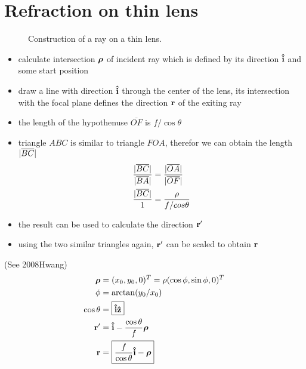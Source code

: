 \section{Refraction on thin lens}
\begin{figure}[!hbt]
  \centering
  
  \caption{Construction of a ray on a thin lens.}
\end{figure}
\begin{itemize}
\item calculate intersection $\boldsymbol\rho$ of incident ray which is defined
  by its direction $\mathbf{\hat{i}}$ and some start position
\item draw a line with direction $\mathbf{\hat{i}}$ through the center of the lens,
  its intersection with the focal plane defines the direction $\mathbf{r}$ of
  the exiting ray
\item the length of the hypothenuse $\overline{OF}$ is $f/\cos\theta$
\item triangle $ABC$ is similar to triangle $FOA$, therefor we can
  obtain the length $\mathopen| \overline{BC} \mathclose|$ 
  \begin{align}
    \frac{\mathopen| \overline{BC} \mathclose|}{\mathopen| \overline{BA} \mathclose|}&=
    \frac{\mathopen| \overline{OA} \mathclose|}{\mathopen| \overline{OF} \mathclose|}\\
    \frac{\mathopen| \overline{BC} \mathclose|}{1}&=
    \frac{\rho}{f/cos\theta}
  \end{align}
\item the result can be used to calculate the direction $\mathbf{r}'$
\item using the two similar triangles again, $\mathbf{r}'$ can be scaled to
  obtain $\mathbf{r}$
\end{itemize}
(See 2008Hwang)
\begin{align}
  \boldsymbol\rho&=(x_0,y_0,0)^T=\rho (\cos\phi,\sin\phi,0)^T\\
  \phi&=\arctan(y_0/x_0)\\
  \cos\theta&=\boxed{\mathbf{\hat{i}}\mathbf{\hat{z}}}\\
  \mathbf{r}'&=\mathbf{\hat{i}}- \frac{\cos\theta}{f}\boldsymbol\rho\\
   \mathbf{r}&=\boxed{\frac{f}{\cos\theta} \mathbf{\hat{i}} -\boldsymbol\rho}
\end{align}
